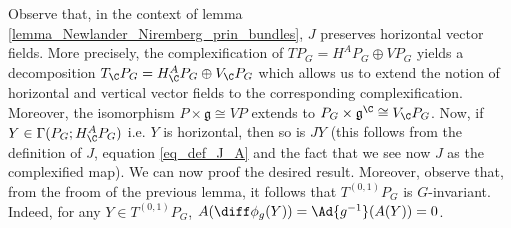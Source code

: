 Observe that, in the context of lemma \ref{lemma_Newlander_Niremberg_prin_bundles}, \(J\) preserves horizontal vector fields. More precisely, the complexification of \(TP_G=H^AP_G \oplus VP_G\) yields a decomposition \(T_\C P_G =H^A_\C P_G \oplus V_\C P_G\) which allows us to extend the notion of horizontal and vertical vector fields to the corresponding complexification. Moreover, the isomorphism \(P \times \mathfrak{g} \cong VP\) extends to \(P_G \times \mathfrak{g}^\C\cong V_\C P_G\). Now, if \(Y \in \Gamma(P_G; H^A_\C P_G)\) i.e. \(Y\) is horizontal, then so is \(JY\) (this follows from the definition of \(J\), equation \eqref{eq_def_J_A} and the fact that we see now \(J\) as the complexified map). We can now proof the desired result. Moreover, observe that, from the froom of the previous lemma, it follows that \(T^{(0,1)}P_G\) is \(G\)-invariant. Indeed, for any \(Y \in T^{(0,1)}P_G\), \(A(\diff\phi_g(Y))=\Ad{g^{-1}} (A(Y))=0\).

